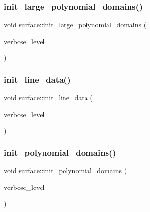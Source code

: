 \mbox{\label{classsurface_a4bed81f2918efe941518ab28d9a695d2}} 
\subsubsection{\texorpdfstring{init\+\_\+large\+\_\+polynomial\+\_\+domains()}{init\_large\_polynomial\_domains()}}
{\footnotesize\ttfamily void surface\+::init\+\_\+large\+\_\+polynomial\+\_\+domains (\begin{DoxyParamCaption}\item[{\mbox{\hyperlink{galois_8h_a09fddde158a3a20bd2dcadb609de11dc}{I\+NT}}}]{verbose\+\_\+level }\end{DoxyParamCaption})}

\mbox{\label{classsurface_a2d9e24e666ca96960e7215f759e899de}} 
\subsubsection{\texorpdfstring{init\+\_\+line\+\_\+data()}{init\_line\_data()}}
{\footnotesize\ttfamily void surface\+::init\+\_\+line\+\_\+data (\begin{DoxyParamCaption}\item[{\mbox{\hyperlink{galois_8h_a09fddde158a3a20bd2dcadb609de11dc}{I\+NT}}}]{verbose\+\_\+level }\end{DoxyParamCaption})}

\mbox{\label{classsurface_a1f13f4c6bdc98d14920a2644a52f8bb6}} 
\subsubsection{\texorpdfstring{init\+\_\+polynomial\+\_\+domains()}{init\_polynomial\_domains()}}
{\footnotesize\ttfamily void surface\+::init\+\_\+polynomial\+\_\+domains (\begin{DoxyParamCaption}\item[{\mbox{\hyperlink{galois_8h_a09fddde158a3a20bd2dcadb609de11dc}{I\+NT}}}]{verbose\+\_\+level }\end{DoxyParamCaption})}

